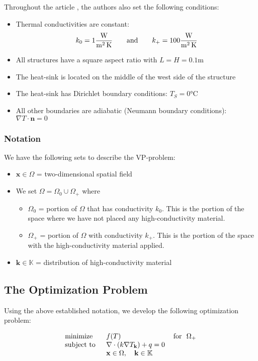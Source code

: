 Throughout the article \cite{Marck2012}, the authors also set the following conditions:
\begin{itemize}
	\item Thermal conductivities are constant:
	$$k_0=1 \si[per-mode=fraction]{\watt\per\square\meter\per\kelvin}\qquad\text{and}\qquad k_+=100 \si[per-mode=fraction]{\watt\per\square\meter\per\kelvin}$$
	\item All structures have a square aspect ratio with $L=H=0.1\si{\meter}$
	\item The heat-sink is located on the middle of the west side of the structure
	\item The heat-sink has Dirichlet boundary conditions: $T_S=0\si{\celsius}$
	\item All other boundaries are adiabatic (Neumann boundary conditions): $\nabla T\cdot\mathbf{n}=0$
\end{itemize}

\subsubsection*{Notation}

We have the following sets to describe the VP-problem:
\begin{itemize}
	\item $\mathbf{x}\in\Omega$ = two-dimensional spatial field
	\item[] We set $\Omega = \Omega_0\cup\Omega_+$ where
	\begin{itemize}
		\item $\Omega_0$ = portion of $\Omega$ that has conductivity $k_0$. This is the portion of the space where we have not placed any high-conductivity material.
		\item $\Omega_+$ = portion of $\Omega$ with conductivity $k_+$. This is the portion of the space with the high-conductivity material applied.
	\end{itemize}
	\item $\mathbf{k}\in\mathbb{K}$ = distribution of high-conductivity material
\end{itemize}

\subsection{The Optimization Problem}

Using the above established notation, we develop the following optimization problem:

\begin{equation}
	\begin{tabular}{lll}
		\text{minimize }   & $f(T)$                                                   & \text{for } $\Omega_+$ \\
		\text{subject to } & $\nabla\cdot\left(k\nabla T_{\mathbf{k}}\right)+q=0$  &                                      \\
		& $\mathbf{x}\in\Omega,\quad\mathbf{k}\in\mathbb{K}$ &                                      
	\end{tabular}\label{SIMP-Optimization-Problem}
\end{equation}

